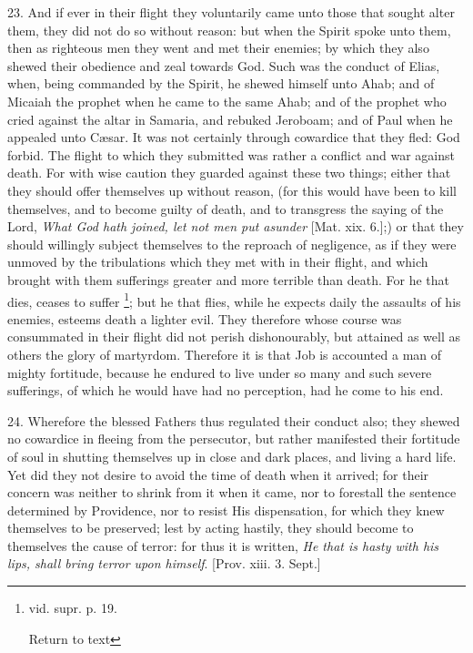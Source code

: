 23. And if ever in their flight they voluntarily
came unto those that sought alter them, they did not do so without
reason: but when the Spirit spoke unto them, then as righteous men
they went and met their enemies; by which they also shewed their
obedience and zeal towards God. Such was the conduct of Elias, when,
being commanded by the Spirit, he shewed himself unto Ahab; and of
Micaiah the prophet when he came to the same Ahab; and of the prophet
who cried against the altar in Samaria, and rebuked Jeroboam; and of
Paul when he appealed unto Cæsar. It was not certainly through
cowardice that they fled: God forbid. The flight to which they
submitted was rather a conflict and war against death. For with wise
caution they guarded against these two things; either that they should
offer themselves up without reason, (for this would have been to kill
themselves, and to become guilty of death, and to transgress the
saying of the Lord, \emph{What God hath joined, let not men put asunder}
[Mat. xix. 6.];) or that they should willingly subject themselves to
the reproach of negligence, as if they were unmoved by the
tribulations which they met with in their flight, and which brought
with them sufferings greater and more terrible than death. For he that
dies, ceases to suffer \footnote{vid. supr. p. 19.

Return to text}; but he
that flies, while he expects daily the assaults of his enemies,
esteems death a lighter evil. They therefore whose course was
consummated in their flight did not perish dishonourably, but attained
as well as others the glory of martyrdom. Therefore it is that Job is
accounted a man of mighty fortitude, because he endured to live under
so many and such severe sufferings, of which he would have had no
perception, had he come to his end.

24. Wherefore the blessed Fathers thus regulated
their conduct also; they shewed no cowardice in fleeing from the
persecutor, but rather manifested their fortitude of soul in shutting
themselves up in close and dark places, and living a hard life. Yet
did they not desire to avoid the time of death when it arrived; for
their concern was neither to shrink from it when it came, nor to
forestall the sentence determined by Providence, nor to resist His
dispensation, for which they knew themselves to be preserved; lest by
acting hastily, they should become to themselves the cause of terror:
for thus it is written, \emph{He that is hasty with his lips, shall bring
terror upon himself}. [Prov. xiii. 3. Sept.]

